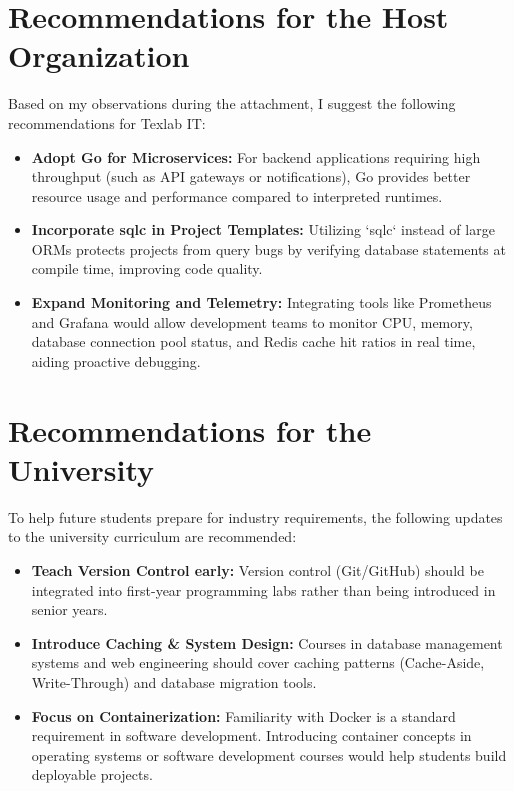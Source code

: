 \section{Recommendations for the Host Organization}
Based on my observations during the attachment, I suggest the following recommendations for Texlab IT:
\begin{itemize}
    \item \textbf{Adopt Go for Microservices:} For backend applications requiring high throughput (such as API gateways or notifications), Go provides better resource usage and performance compared to interpreted runtimes.
    \item \textbf{Incorporate sqlc in Project Templates:} Utilizing `sqlc` instead of large ORMs protects projects from query bugs by verifying database statements at compile time, improving code quality.
    \item \textbf{Expand Monitoring and Telemetry:} Integrating tools like Prometheus and Grafana would allow development teams to monitor CPU, memory, database connection pool status, and Redis cache hit ratios in real time, aiding proactive debugging.
\end{itemize}

\section{Recommendations for the University}
To help future students prepare for industry requirements, the following updates to the university curriculum are recommended:
\begin{itemize}
    \item \textbf{Teach Version Control early:} Version control (Git/GitHub) should be integrated into first-year programming labs rather than being introduced in senior years.
    \item \textbf{Introduce Caching & System Design:} Courses in database management systems and web engineering should cover caching patterns (Cache-Aside, Write-Through) and database migration tools.
    \item \textbf{Focus on Containerization:} Familiarity with Docker is a standard requirement in software development. Introducing container concepts in operating systems or software development courses would help students build deployable projects.
\end{itemize}

